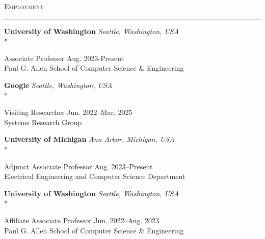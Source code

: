\documentclass[10pt]{article}
\newcommand{\mysec}[1]{%
  \par\addvspace{2em}%
  \Needspace{8\baselineskip}%
  \noindent\textsc{\large #1}\par\vspace{1mm}\hrule\vspace{2mm}%
}
\newcommand{\mysub}[3]{\textbf{#1} {#2} \hfill {\em #3}}
\newcommand{\myssub}[1]{%
  \par\begingroup
    \leftskip=2mm\relax
    \noindent #1\par
  \endgroup
  \vspace{1mm}%
}
\newenvironment{keepblock}{\par\Needspace{4\baselineskip}\noindent}{\par}
\begin{document}
\mysec{Employment}

\begin{keepblock}
\mysub{University of Washington}{}{Seattle, Washington, USA} \\*
\myssub{Associate Professor\vspace{1mm} \hfill Aug. 2023-Present \\
  Paul G. Allen School of Computer Science \& Engineering}
\end{keepblock}

\begin{keepblock}
\mysub{Google}{}{Seattle, Washington, USA} \\*
\myssub{Visiting Researcher\vspace{1mm} \hfill Jun. 2022--Mar. 2025 \\
   Systems Research Group}
\end{keepblock}

\begin{keepblock}
\mysub{University of Michigan}{}{Ann Arbor, Michigan, USA} \\*
\myssub{Adjunct Associate Professor\vspace{1mm} \hfill Aug. 2023--Present \\
  Electrical Engineering and Computer Science Department}
\end{keepblock}

\begin{keepblock}
\mysub{University of Washington}{}{Seattle, Washington, USA} \\*
\myssub{Affiliate Associate Professor\vspace{1mm} \hfill Jun. 2022--Aug. 2023 \\
  Paul G. Allen School of Computer Science \& Engineering}
\end{keepblock}
\end{document}
